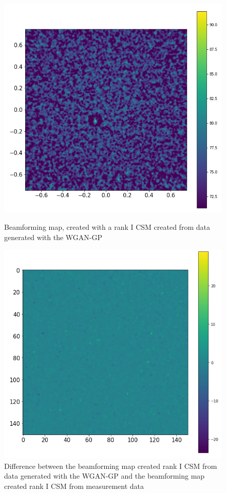 \documentclass{article}
\begin{document}
\begin{figure}
    \centering
    \begin{minipage}{0.48\textwidth}
        \includegraphics[width=\textwidth]{../figs/sample_rank_I_beamforming.png}    
    \caption{Beamforming map, created with a rank I CSM created from data generated with the WGAN-GP}
    \label{fig:sample_rank_I_beamforming}
    \end{minipage}\hfill
    \begin{minipage}{0.48\textwidth}
        \includegraphics[width=\textwidth]{../figs/sample_rank_I_beamforming_difference.png}    
    \caption{Difference between the beamforming map created rank I CSM from data generated with the WGAN-GP and the beamforming map created rank I CSM from measurement data}
    \label{fig:sample_rank_I_beamforming_difference}
    \end{minipage}
\end{figure}
\end{document}
